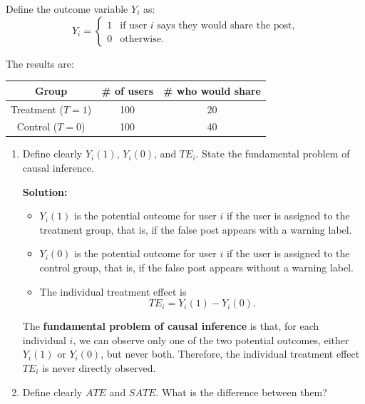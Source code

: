\documentclass[11pt]{exam}
\begin{document}
\begin{questions}
Define the outcome variable $Y_i$ as:
\[
Y_i =
\begin{cases}
1 & \text{if user } i \text{ says they would share the post,} \\
0 & \text{otherwise.}
\end{cases}
\]

The results are:

\begin{center}
\begin{tabular}{ccc}
Group & \# of users & \# who would share \\
\hline
Treatment ($T=1$) & 100 & 20 \\
Control ($T=0$) & 100 & 40 \\
\hline
\end{tabular}
\end{center}

\begin{enumerate}[leftmargin = 0.5cm, label = (\alph*), rightmargin = 0.2cm]

    \item Define clearly $Y_i(1)$, $Y_i(0)$, and $TE_i$. State the fundamental problem of causal inference.

    \begin{solutionorbox}[8.5cm]
    \textbf{Solution:} \begin{itemize}[leftmargin = 0.6cm]
        \item $Y_i(1)$ is the potential outcome for user $i$ if the user is assigned to the treatment group, that is, if the false post appears with a warning label.
        
        \item $Y_i(0)$ is the potential outcome for user $i$ if the user is assigned to the control group, that is, if the false post appears without a warning label.
        
        \item The individual treatment effect is
        \[
        TE_i = Y_i(1)-Y_i(0).
        \]
    \end{itemize}

    The \textbf{fundamental problem of causal inference} is that, for each individual $i$, we can observe only one of the two potential outcomes, either $Y_i(1)$ or $Y_i(0)$, but never both. Therefore, the individual treatment effect $TE_i$ is never directly observed.
    \end{solutionorbox}

    \item Define clearly $ATE$ and $SATE$. What is the difference between them?


\end{enumerate}
\end{questions}
\end{document}
